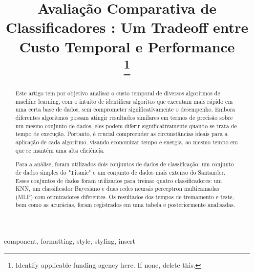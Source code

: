 \documentclass[conference]{IEEEtran}
\begin{document}
\title{Avaliação Comparativa de Classificadores : Um Tradeoff entre Custo Temporal e Performance\\
\thanks{Identify applicable funding agency here. If none, delete this.}
}

\author{
\and
{}
}

\maketitle

\begin{abstract}
    Este artigo tem por objetivo analisar o custo temporal de diversos algoritmos de machine learning, com o intuito de identificar algoritos que executam mais rápido em uma certa base de dados, sem comprometer significativamente o desempenho. Embora diferentes algoritmos possam atingir resultados similares em termos de precisão sobre um mesmo conjunto de dados, eles podem diferir significativamente quando se trata de tempo de execução. Portanto, é crucial compreender as circunstâncias ideais para a aplicação de cada algoritmo, visando economizar tempo e energia, ao mesmo tempo em que se mantém uma alta eficiência.
    
    Para a análise, foram utilizados dois conjuntos de dados de classificação: um conjunto de dados simples do "Titanic" e um conjunto de dados mais extenso do Santander. Esses conjuntos de dados foram utilizados para treinar quatro classificadores: um KNN, um classificador Bayesiano e duas redes neurais perceptron multicamadas (MLP) com otimizadores diferentes. Os resultados dos tempos de treinamento e teste, bem como as acurácias, foram registrados em uma tabela e posteriormente analisadas.
\end{abstract}

\begin{IEEEkeywords}
component, formatting, style, styling, insert
\end{IEEEkeywords}
\end{document}

